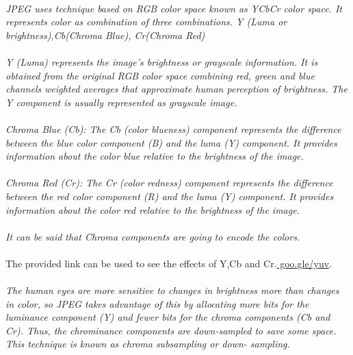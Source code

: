 \documentclass[12pt, letterpaper]{article}
\begin{document}
\paragraph{}\textit{JPEG uses technique based on RGB color space known as YCbCr color space. It represents color as combination of three combinations. Y (Luma or brightness),Cb(Chroma Blue), Cr(Chroma Red) }
\paragraph{}\textit{Y (Luma) represents the image’s brightness or grayscale information. It is obtained from the original RGB color space combining red, green and blue channels weighted averages that approximate human perception of brightness. The Y component is usually represented as grayscale image. }
\paragraph{}\textit{Chroma Blue (Cb): The Cb (color blueness) component represents the difference between the blue color component (B) and the luma (Y) component. It provides information about the color blue relative to the brightness of the image.  }
\paragraph{}\textit{Chroma Red (Cr): The Cr (color redness) component represents the difference between the red color component (R) and the luma (Y) component. It provides information about the color red relative to the brightness of the image.}
\paragraph{}\textit{It can be said that Chroma components are going to encode the colors.}
\paragraph{}The provided link can be used to see the effects of Y,Cb and Cr.\url{ goo.gle/yuv}.
\paragraph{}\textit{The human eyes are more sensitive to changes in brightness more than changes in color, so JPEG takes advantage of this by allocating more bits for the luminance component (Y) and fewer bits for the chroma components (Cb and Cr). Thus, the chrominance components are down-sampled to save some space. This technique is known as chroma subsampling or down- sampling. }
\end{document}
